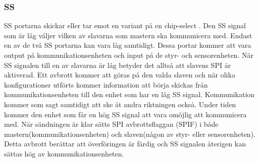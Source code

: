 \subsubsection{SS}
SS portarna skickar eller tar emot en variant på en chip-select . Den SS signal som är låg väljer vilken av slavarna som mastern ska kommunicera med. Endast en av de två SS portarna kan vara låg samtidigt. Dessa portar kommer att vara output på kommunikationsenheten och input på de styr- och sensorenheten.
När SS signalen till en av slavarna är låg betyder det alltså att slavens SPI är aktiverad. Ett avbrott kommer att göras på den valda slaven och när olika konfigurationer utförts kommer information att börja skickas från kommunikationsenheten till den enhet som har en låg SS signal. Kommunikation kommer som sagt samtidigt att ske åt andra riktningen också. Under tiden kommer den enhet som får en hög SS signal att vara omöjlig att kommunicera med.
När sändningen är klar sätts SPI avbrottsflaggan (SPIF) i både mastern(kommunikationsenheten) och slaven(någon av styr- eller sensorenheten). Detta avbrott berättar att överföringen är färdig och SS signalen återigen kan sättas hög av kommunikationsenheten.







